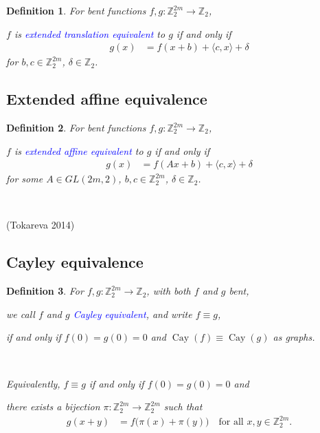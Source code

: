 \documentclass[12pt,a4paper]{article}
\newcommand{\mb}[1]{\mathbb{#1}}
\newcommand{\Z}{\mb{Z}}
\newcommand{\To}{\rightarrow}
\newcommand{\slidecite}[1]{\tiny{(#1)}\normalsize{}}
\newcommand{\Emph}[1]{\emph{\textcolor{blue}{#1}}}
\newcommand{\Cay}[1]{\operatorname{Cay}\left(#1\right)}
\newtheorem{Definition}{Definition}
\begin{document}
\begin{Definition}
For bent functions $f,g : \Z_2^{2m} \To \Z_2$, 

$f$ is \Emph{extended translation equivalent} to $g$ if and only if
\begin{align*}
g(x) &= f(x + b) + \langle c, x \rangle + \delta 
\end{align*}
for $b, c \in \Z_2^{2m}$, $\delta \in \Z_2$.
\end{Definition}

\subsection*{Extended affine equivalence}

\begin{Definition}
For bent functions $f,g : \Z_2^{2m} \To \Z_2$, 

$f$ is \Emph{extended affine equivalent} to $g$ if and only if
\begin{align*}
g(x) &= f(A x + b) + \langle c, x \rangle + \delta 
\end{align*}
for some $A \in GL(2m,2)$, $b, c \in \Z_2^{2m}$, $\delta \in \Z_2$.
\end{Definition}
~

\slidecite{Tokareva 2014}
\subsection*{Cayley equivalence}
\begin{Definition}
%
For $f, g : \Z_2^{2m} \To \Z_2$, with both $f$ and $g$ bent, 

we call $f$ and $g$ \Emph{Cayley equivalent},
and write $f \equiv g$, 

if and only if $f(0)=g(0)=0$ and $\Cay{f} \equiv \Cay{g}$ as graphs.

~

Equivalently, $f \equiv g$ if and only if $f(0)=g(0)=0$ and 

there exists a bijection $\pi : \Z_2^{2m} \To \Z_2^{2m}$ such that
\begin{align*}
g(x+y) &= f \big(\pi(x)+\pi(y)\big) \quad \text{for all~} x,y \in \Z_2^{2m}. 
\end{align*}
\end{Definition}
\end{document}
